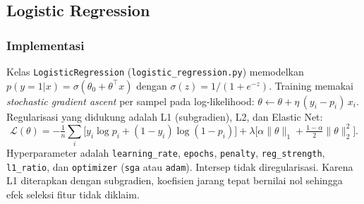 \documentclass[12pt,a4paper]{article}
\begin{document}
\subsection{Logistic Regression}
\subsubsection{Implementasi}
Kelas \texttt{LogisticRegression} (\texttt{logistic\_regression.py}) memodelkan $p(y=1|x)=\sigma(\theta_0+\theta^\top x)$ dengan $\sigma(z)=1/(1+e^{-z})$. Training memakai \textit{stochastic gradient ascent} per sampel pada log-likelihood: $\theta\leftarrow\theta+\eta\,(y_i-p_i)\,x_i$. Regularisasi yang didukung adalah L1 (subgradien), L2, dan Elastic Net:
\begin{equation}
\mathcal{L}(\theta)=-\tfrac1n\sum_i\big[y_i\log p_i+(1-y_i)\log(1-p_i)\big]+\lambda\Big[\alpha\|\theta\|_1+\tfrac{1-\alpha}{2}\|\theta\|_2^2\Big].
\end{equation}
Hyperparameter adalah \texttt{learning\_rate}, \texttt{epochs}, \texttt{penalty}, \texttt{reg\_strength}, \texttt{l1\_ratio}, dan \texttt{optimizer} (\texttt{sga} atau \texttt{adam}). Intersep tidak diregularisasi. Karena L1 diterapkan dengan subgradien, koefisien jarang tepat bernilai nol sehingga efek seleksi fitur tidak diklaim.
\end{document}

